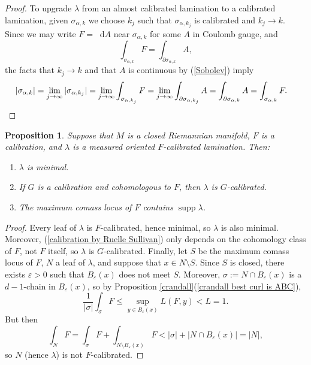 \documentclass[reqno,11pt]{amsart}
\newcommand*\dif{\mathop{}\!\mathrm{d}}
\DeclareMathOperator{\supp}{supp}
\newtheorem{proposition}[theorem]{Proposition}
\theoremstyle{definition}
\numberwithin{equation}{section}
\begin{document}
\begin{proof}
To upgrade $\lambda$ from an almost calibrated lamination to a calibrated lamination, given $\sigma_{\alpha, k}$ we choose $k_j$ such that $\sigma_{\alpha, k_j}$ is calibrated and $k_j \to k$.
Since we may write $F = \dif A$ near $\sigma_{\alpha, k}$ for some $A$ in Coulomb gauge, and 
$$\int_{\sigma_{\alpha, k}} F = \int_{\partial \sigma_{\alpha, k}} A,$$
the facts that $k_j \to k$ and that $A$ is continuous by (\ref{Sobolev}) imply 
\begin{align*}
|\sigma_{\alpha, k}| &= \lim_{j \to \infty} |\sigma_{\alpha, k_j}| = \lim_{j \to \infty} \int_{\sigma_{\alpha, k_j}} F = \lim_{j \to \infty} \int_{\partial \sigma_{\alpha, k_j}} A = \int_{\partial \sigma_{\alpha, k}} A = \int_{\sigma_{\alpha, k}} F. \qedhere 
\end{align*}
\end{proof}

\begin{proposition}\label{properties of calibrated laminations}
Suppose that $M$ is a closed Riemannian manifold, $F$ is a calibration, and $\lambda$ is a measured oriented $F$-calibrated lamination.
Then:
\begin{enumerate}
\item $\lambda$ is minimal.
\item If $G$ is a calibration and cohomologous to $F$, then $\lambda$ is $G$-calibrated.
\item The maximum comass locus of $F$ contains $\supp \lambda$.
\end{enumerate}
\end{proposition}
\begin{proof}
Every leaf of $\lambda$ is $F$-calibrated, hence minimal, so $\lambda$ is also minimal.
Moreover, (\ref{calibration by Ruelle Sullivan}) only depends on the cohomology class of $F$, not $F$ itself, so $\lambda$ is $G$-calibrated.
Finally, let $S$ be the maximum comass locus of $F$, $N$ a leaf of $\lambda$, and suppose that $x \in N \setminus S$.
Since $S$ is closed, there exists $\varepsilon > 0$ such that $B_\varepsilon(x)$ does not meet $S$.
Moreover, $\sigma := N \cap B_\varepsilon(x)$ is a $d-1$-chain in $B_\varepsilon(x)$, so by Proposition \ref{crandall}(\ref{crandall best curl is ABC}),
$$\frac{1}{|\sigma|} \int_\sigma F \leq \sup_{y \in B_\varepsilon(x)} L(F, y) < L = 1.$$
But then 
$$\int_N F = \int_\sigma F + \int_{N \setminus B_\varepsilon(x)} F < |\sigma| + |N \cap B_\varepsilon(x)| = |N|,$$
so $N$ (hence $\lambda$) is not $F$-calibrated.
\end{proof}
\end{document}
